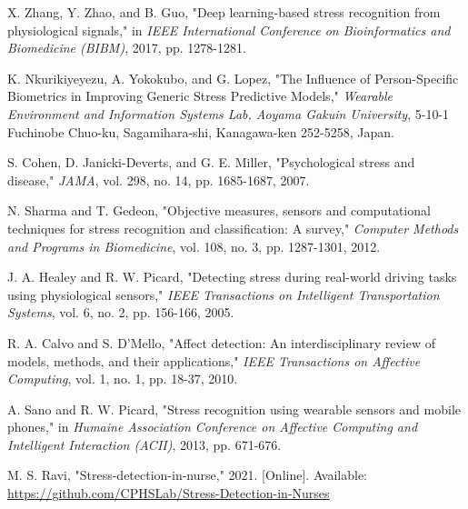 \documentclass{article}
\begin{document}
\begin{thebibliography}{}
X. Zhang, Y. Zhao, and B. Guo, "Deep learning-based stress recognition from physiological signals," in \textit{IEEE International Conference on Bioinformatics and Biomedicine (BIBM)}, 2017, pp. 1278-1281.

K. Nkurikiyeyezu, A. Yokokubo, and G. Lopez, "The Influence of Person-Specific Biometrics in Improving Generic Stress Predictive Models," \textit{Wearable Environment and Information Systems Lab, Aoyama Gakuin University}, 5-10-1 Fuchinobe Chuo-ku, Sagamihara-shi, Kanagawa-ken 252-5258, Japan.

S. Cohen, D. Janicki-Deverts, and G. E. Miller, "Psychological stress and disease," \textit{JAMA}, vol. 298, no. 14, pp. 1685-1687, 2007.

N. Sharma and T. Gedeon, "Objective measures, sensors and computational techniques for stress recognition and classification: A survey," \textit{Computer Methods and Programs in Biomedicine}, vol. 108, no. 3, pp. 1287-1301, 2012.

J. A. Healey and R. W. Picard, "Detecting stress during real-world driving tasks using physiological sensors," \textit{IEEE Transactions on Intelligent Transportation Systems}, vol. 6, no. 2, pp. 156-166, 2005.

R. A. Calvo and S. D'Mello, "Affect detection: An interdisciplinary review of models, methods, and their applications," \textit{IEEE Transactions on Affective Computing}, vol. 1, no. 1, pp. 18-37, 2010.

A. Sano and R. W. Picard, "Stress recognition using wearable sensors and mobile phones," in \textit{Humaine Association Conference on Affective Computing and Intelligent Interaction (ACII)}, 2013, pp. 671-676.

M. S. Ravi, "Stress-detection-in-nurse," 2021. [Online]. Available: \url{https://github.com/CPHSLab/Stress-Detection-in-Nurses}
\end{thebibliography}
\end{document}
